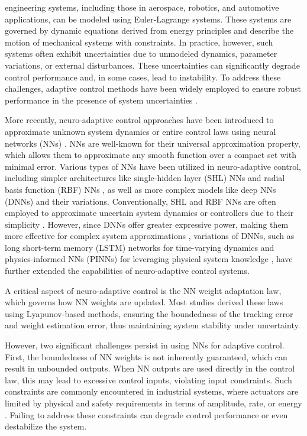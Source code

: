 \documentclass[journal]{IEEEtran}
\begin{document}
 engineering systems, including those in aerospace, robotics, and automotive applications, can be modeled using Euler-Lagrange systems. 
These systems are governed by dynamic equations derived from energy principles and describe the motion of mechanical systems with constraints. 
In practice, however, such systems often exhibit uncertainties due to unmodeled dynamics, parameter variations, or external disturbances. 
These uncertainties can significantly degrade control performance and, in some cases, lead to instability. 
To address these challenges, adaptive control methods have been widely employed to ensure robust performance in the presence of system uncertainties \cite{Ioannou:2006aa, Tao:2003aa}.

More recently, neuro-adaptive control approaches have been introduced to approximate unknown system dynamics or entire control laws using neural networks (NNs) \cite{Farrell:2006aa}. 
NNs are well-known for their universal approximation property, which allows them to approximate any smooth function over a compact set with minimal error. 
Various types of NNs have been utilized in neuro-adaptive control, including simpler architectures like single-hidden layer (SHL) NNs \cite{Ge:2010aa, Yesildirek:1995aa} and radial basis function (RBF) NNs \cite{Liu:2013ab,Ge:2002aa}, as well as more complex models like deep NNs (DNNs) \cite{Patil:2022aa} and their variations. 
Conventionally, SHL and RBF NNs are often employed to approximate uncertain system dynamics or controllers due to their simplicity \cite{Esfandiari:2014aa,Esfandiari:2015aa,Yesildirek:1995aa,Gao:2006aa}.
However, since DNNs offer greater expressive power, making them more effective for complex system approximations \cite{Rolnick:2018aa}, variations of DNNs, such as long short-term memory (LSTM) networks for time-varying dynamics \cite{Griffis:2023aa} and physics-informed NNs (PINNs) for leveraging physical system knowledge \cite{Hart:2024aa}, have further extended the capabilities of neuro-adaptive control systems.

A critical aspect of neuro-adaptive control is the NN weight adaptation law, which governs how NN weights are updated. 
Most studies derived these laws using Lyapunov-based methods, ensuring the boundedness of the tracking error and weight estimation error, thus maintaining system stability under uncertainty.

However, two significant challenges persist in using NNs for adaptive control. 
First, the boundedness of NN weights is not inherently guaranteed, which can result in unbounded outputs. 
When NN outputs are used directly in the control law, this may lead to excessive control inputs, violating input constraints. 
Such constraints are commonly encountered in industrial systems, where actuators are limited by physical and safety requirements in terms of amplitude, rate, or energy \cite{Esfandiari:2021aa}. 
Failing to address these constraints can degrade control performance or even destabilize the system.
\end{document}
